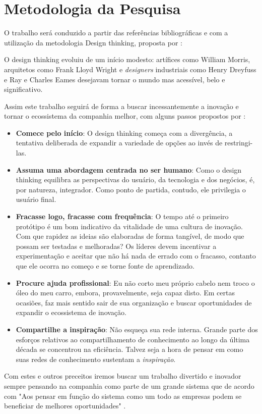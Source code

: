 \chapter{Metodologia da Pesquisa}

O trabalho será conduzido a partir das referências bibliográficas e com a utilização da metodologia Design thinking, proposta por :
\begin{citacao}
O design thinking evoluiu de um início modesto: artífices como William Morris, arquitetos como Frank Lloyd Wright e \textit{designers} industriais como Henry Dreyfuss e Ray e Charles Eames desejavam tornar o mundo mas acessível, belo e significativo.
\end{citacao}

Assim este trabalho seguirá de forma a buscar incessantemente a inovação e tornar o ecossistema da companhia melhor, com alguns passos propostos por :

\begin{citacao}
\begin{itemize}
\item \textbf{Comece pelo início}: O design thinking começa com a divergência, a tentativa deliberada de expandir a variedade de opções ao invés de restringi-las.
\item \textbf{Assuma uma abordagem centrada no ser humano}: Como o design thinking equilibra as perspectivas do usuário, da tecnologia e dos negócios, é, por natureza, integrador. Como ponto de partida, contudo, ele privilegia o usuário final.
\item \textbf{Fracasse logo, fracasse com frequência}: O tempo até o primeiro protótipo é um bom indicativo da vitalidade de uma cultura de inovação. Com que rapidez as ideias são elaboradas de forma tangível, de modo que possam ser testadas e melhoradas? Os líderes devem incentivar a experimentação e aceitar que não há nada de errado com o fracasso, contanto que ele ocorra no começo e se torne fonte de aprendizado.
\item \textbf{Procure ajuda profissional}: Eu não corto meu próprio cabelo nem troco o óleo do meu carro, embora, provavelmente, seja capaz disto. Em certas ocasiões, faz mais sentido sair de sua organização e buscar oportunidades de expandir o ecossistema de inovação.
\item \textbf{Compartilhe a inspiração}: Não esqueça sua rede interna. Grande parte dos esforços relativos ao compartilhamento de conhecimento ao longo da última década se concentrou na eficiência. Talvez seja a hora de pensar em como suas redes de conhecimento sustentam a \emph{inspiração}.
\end{itemize}
\end{citacao}
Com estes e outros preceitos iremos buscar um trabalho divertido e inovador sempre pensando na companhia como parte de um grande sistema que de acordo com  "Aos pensar em função do sistema como um todo as empresas podem se beneficiar de melhores oportunidades" .
